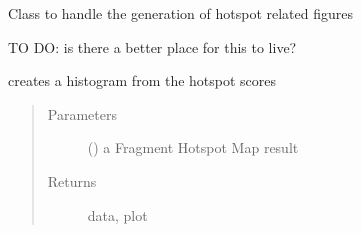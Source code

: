 \documentclass[letterpaper,10pt,english]{sphinxmanual}
\begin{document}
\begin{fulllineitems}
\label{\detokenize{hs_utilities_api:hotspots.hs_utilities.Figures}}
Class to handle the generation of hotspot related figures

TO DO: is there a better place for this to live?

\begin{fulllineitems}
\label{\detokenize{hs_utilities_api:hotspots.hs_utilities.Figures.histogram}}
creates a histogram from the hotspot scores
\begin{quote}\begin{description}
\item[{Parameters}] \leavevmode
{} ({\hyperref[\detokenize{result_api:hotspots.result.Results}]{}}) \textendash{} a Fragment Hotspot Map result

\item[{Returns}] \leavevmode
data, plot

\end{description}\end{quote}

\end{fulllineitems}


\end{fulllineitems}

\end{document}
